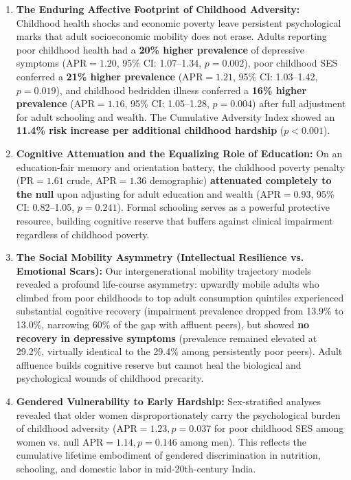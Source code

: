 \begin{enumerate}
    \item \textbf{The Enduring Affective Footprint of Childhood Adversity:}
    Childhood health shocks and economic poverty leave persistent psychological marks that adult socioeconomic mobility does not erase. Adults reporting poor childhood health had a \textbf{20\% higher prevalence} of depressive symptoms ($\text{APR} = 1.20$, 95\% CI: 1.07--1.34, $p = 0.002$), poor childhood SES conferred a \textbf{21\% higher prevalence} ($\text{APR} = 1.21$, 95\% CI: 1.03--1.42, $p = 0.019$), and childhood bedridden illness conferred a \textbf{16\% higher prevalence} ($\text{APR} = 1.16$, 95\% CI: 1.05--1.28, $p = 0.004$) after full adjustment for adult schooling and wealth. The Cumulative Adversity Index showed an \textbf{11.4\% risk increase per additional childhood hardship} ($p < 0.001$).
    
    \item \textbf{Cognitive Attenuation and the Equalizing Role of Education:}
    On an education-fair memory and orientation battery, the childhood poverty penalty ($\text{PR} = 1.61$ crude, $\text{APR} = 1.36$ demographic) \textbf{attenuated completely to the null} upon adjusting for adult education and wealth ($\text{APR} = 0.93$, 95\% CI: 0.82--1.05, $p = 0.241$). Formal schooling serves as a powerful protective resource, building cognitive reserve that buffers against clinical impairment regardless of childhood poverty.

    \item \textbf{The Social Mobility Asymmetry (Intellectual Resilience vs. Emotional Scars):}
    Our intergenerational mobility trajectory models revealed a profound life-course asymmetry: upwardly mobile adults who climbed from poor childhoods to top adult consumption quintiles experienced substantial cognitive recovery (impairment prevalence dropped from 13.9\% to 13.0\%, narrowing 60\% of the gap with affluent peers), but showed \textbf{no recovery in depressive symptoms} (prevalence remained elevated at 29.2\%, virtually identical to the 29.4\% among persistently poor peers). Adult affluence builds cognitive reserve but cannot heal the biological and psychological wounds of childhood precarity.

    \item \textbf{Gendered Vulnerability to Early Hardship:}
    Sex-stratified analyses revealed that older women disproportionately carry the psychological burden of childhood adversity ($\text{APR} = 1.23, p = 0.037$ for poor childhood SES among women vs. null $\text{APR} = 1.14, p = 0.146$ among men). This reflects the cumulative lifetime embodiment of gendered discrimination in nutrition, schooling, and domestic labor in mid-20th-century India.


\end{enumerate}
